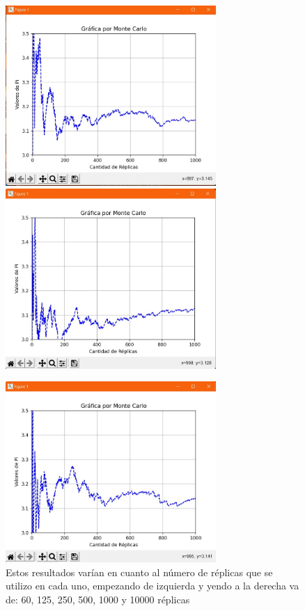 \documentclass{article}
\begin{document}
\begin{figure}[H]
    \centering
    \includegraphics[width=80mm]{1000.jpeg} %
    \centering
    \includegraphics[width=80mm]{5000.jpeg} %
    \label{grafica:trece}
\end{figure}

\begin{figure}[H] %
    \centering
    \includegraphics[width=80mm]{10000.jpeg} %
    \caption{Estos resultados varían en cuanto al número de réplicas que se utilizo en cada uno, empezando de izquierda y yendo a la derecha va de: 60, 125, 250, 500, 1000 y 10000 réplicas}
\end{figure}
\end{document}
